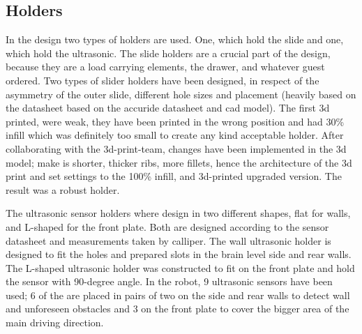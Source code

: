 \documentclass[11pt]{article}
\begin{document}
\subsection*{Holders}
In the design two types of holders are used. One, which hold the slide and one, which hold the ultrasonic. The slide holders are a crucial part of the design, because they are a load carrying elements, the drawer, and whatever guest ordered. Two types of slider holders have been designed, in respect of the asymmetry of the outer slide, different hole sizes and placement (heavily based on the datasheet based on the accuride datasheet and cad model). The first 3d printed, were weak, they have been printed in the wrong position and had 30\% infill which was definitely too small to create any kind acceptable holder. After collaborating with the 3d-print-team, changes have been implemented in the 3d model; make is shorter, thicker ribs, more fillets, hence the architecture of the 3d print and set settings to the 100\% infill, and 3d-printed upgraded version. The result was a robust holder.


The ultrasonic sensor holders where design in two different shapes, flat for walls, and L-shaped for the front plate. Both are designed according to the sensor datasheet and measurements taken by calliper. The wall ultrasonic holder is designed to fit the holes and prepared slots in the brain level side and rear walls. The L-shaped ultrasonic holder was constructed to fit on the front plate and hold the sensor with 90-degree angle. In the robot, 9 ultrasonic sensors have been used; 6 of the are placed in pairs of two on the side and rear walls to detect wall and unforeseen obstacles and 3 on the front plate to cover the bigger area of the main driving direction.
\end{document}
